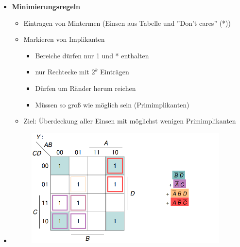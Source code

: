 \documentclass[11pt,a4paper]{article}
\begin{document}
\begin{itemize}
\item \textbf{Minimierungsregeln}
	\begin{itemize}
	\item Eintragen von Mintermen (Einsen aus Tabelle und ''Don't cares'' (*))
	\item Markieren von Implikanten
		\begin{itemize}
		\item Bereiche dürfen nur 1 und * enthalten
		\item nur Rechtecke mit $2^k$ Einträgen
		\item Dürfen um Ränder herum reichen
		\item Müssen so groß wie möglich sein (Primimplikanten)
		\end{itemize}
	\item Ziel: Überdeckung aller Einsen mit möglichst wenigen Primimplikanten
	\end{itemize}
	\item[] \begin{figure}[H]
				\begin{center}
				\includegraphics[height=6cm]{Bilder/karnaugh42}
				\end{center}
			\end{figure}
			


\end{itemize}

\pagebreak
\end{document}
